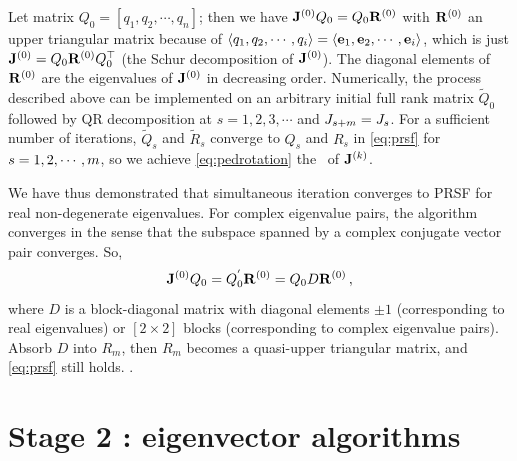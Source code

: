 \documentclass[final,leqno,onefignum,onetabnum]{siamltexmm}
\begin{document}
Let matrix $Q_{0}=[q_{1},q_{2},\cdots ,q_{n}]$; then we have
$\ps{\jMps}{0}Q_{0}=Q_{0}\ps{R}{0}$ with $\ps{R}{0}$ an upper triangular
matrix because of $\langle q_{1},q_{2},\cdots,q_{i} \rangle=\langle
\edit{\jEigvec[1], \jEigvec[2], \cdots,  \jEigvec[i]} \rangle$, which is just
$\ps{\jMps}{0}=Q_{0}\ps{R}{0}Q^\top_{0}$ (the Schur decomposition of
$\ps{\jMps}{0}$). The diagonal elements of $\ps{R}{0}$ are the
eigenvalues of $\ps{\jMps}{0}$ in decreasing order.
Numerically, the process described above can be implemented on an
arbitrary initial full rank matrix $\tilde{Q}_0$ followed by QR
decomposition at
$s=1,2,3,\cdots$ and $\jMps_{s+m}=\jMps_{s}$. For a sufficient number of
iterations, $\tilde{Q}_{s}$ and $\tilde{R}_{s}$ converge to $Q_{s}$ and
$R_{s}$ in \eqref{eq:prsf} for $s=1,2,\cdots,\edit{m}$, so we achieve
\eqref{eq:pedrotation} the \psd\ of $\ps{\jMps}{k}$.

We have thus demonstrated that simultaneous iteration converges to
PRSF for real non-degenerate eigenvalues.
For complex eigenvalue pairs, the algorithm converges in the sense that
the subspace spanned by a complex conjugate vector pair converges. So,
\begin{equation}
  \label{eq:simcplx}
  \ps{\jMps}{0}Q_{0}=Q^{'}_{0}\ps{R}{0}=Q_{0}D\ps{R}{0}
  \,,
\end{equation}
where $D$ is a block-diagonal matrix with diagonal elements $\pm 1$
(corresponding to real eigenvalues) or $[2\!\times\! 2]$ blocks
(corresponding to complex eigenvalue pairs). Absorb $D$ into $R_{m}$,
then $R_{m}$ becomes a quasi-upper triangular matrix, and \eqref{eq:prsf}
still holds.
.


\section{Stage 2 : eigenvector algorithms}
\label{sect:eigenvec}
\end{document}
